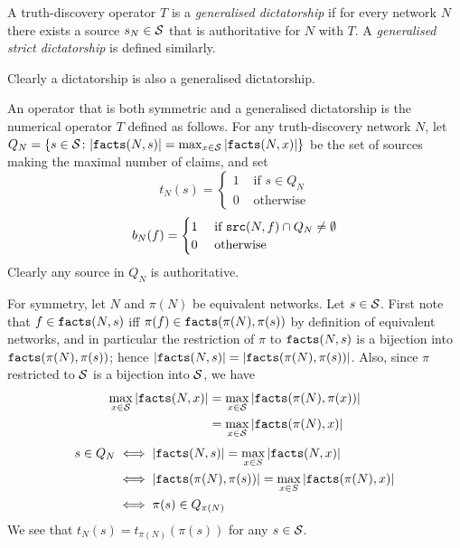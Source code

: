 \documentclass[../main.tex]{subfiles}
\begin{document}
\begin{definition}
\label{def:gen_dict}
A truth-discovery operator $T$ is a \emph{generalised dictatorship} if for
every network $N$ there exists a source $s_N \in \S$ that is authoritative for
$N$ with $T$. A \emph{generalised strict dictatorship} is defined similarly.
\end{definition}

Clearly a dictatorship is also a generalised dictatorship.

\begin{example}
\label{example:symm_and_gen_dict}
An operator that is both symmetric and a generalised dictatorship is the
numerical operator $T$ defined as follows. For any truth-discovery network $N$,
let $Q_N = \{s \in \S \colon |\fact(N, s)| = \max_{x \in \S}{|\fact(N, x)|}\}$
be the set of sources making the maximal number of claims, and set
\[
    t_N(s) = \begin{cases}
        1 & \text{ if } s \in Q_N \\
        0 & \text{ otherwise}
    \end{cases}
\]
\[
    b_N(f) = \begin{cases}
        1 & \text{ if } \src(N, f) \cap Q_N \ne \emptyset \\
        0 & \text{ otherwise}
    \end{cases}
\]
Clearly any source in $Q_N$ is authoritative.

For symmetry, let $N$ and $\pi(N)$ be equivalent networks. Let $s \in \S$.
First note that $f \in \fact(N, s)$ iff $\pi(f) \in \fact(\pi(N), \pi(s))$ by
definition of equivalent networks, and in particular the restriction of $\pi$
to $\fact(N, s)$ is a bijection into $\fact(\pi(N), \pi(s))$; hence $|\fact(N,
s)| = |\fact(\pi(N), \pi(s))|$. Also, since $\pi$ restricted to $\S$ is a
bijection into $\S$, we have
\begin{align*}
    \max_{x \in \S}{|\fact(N, x)|} & = \max_{x \in \S}{|\fact(\pi(N), \pi(x))|} \\
                                   & = \max_{x \in \S}{|\fact(\pi(N), x)|}
\end{align*}
\begin{align*}
    s \in Q_N & \iff |\fact(N, s)| = \max_{x \in S}{|\fact(N, x)|} \\
              & \iff |\fact(\pi(N), \pi(s))| = \max_{x \in S}{|\fact(\pi(N), x)|} \\
              & \iff \pi(s) \in Q_{\pi(N)}
\end{align*}
We see that $t_N(s) = t_{\pi(N)}(\pi(s))$ for any $s \in \S$.


\end{example}
\end{document}
